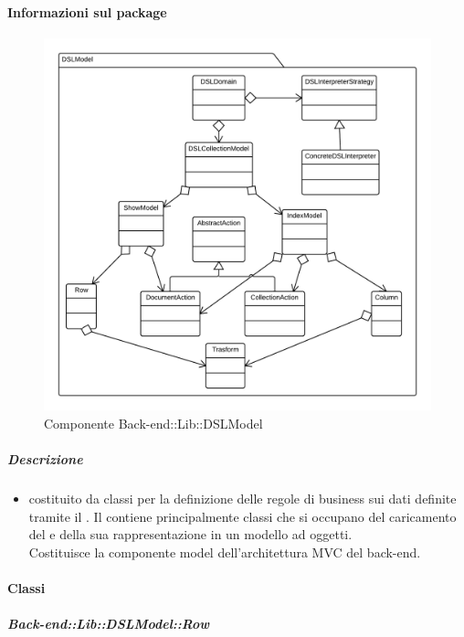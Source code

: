   \paragraph{Informazioni sul package} 
    \begin{figure}[H] 
      \begin{center} 
        \includegraphics[width=\textwidth]{packages/Back-end::Lib::DSLModel.png}  
        \caption{Componente Back-end::Lib::DSLModel}
      \end{center}  
    \end{figure} 
  \subparagraph{Descrizione} 
    \begin{itemize}
    \item[]  costituito da classi per la definizione delle regole di business sui dati definite tramite il . 
Il  contiene principalmente classi che si occupano del caricamento del  e della sua rappresentazione in un modello ad oggetti. \\
Costituisce la componente model dell'architettura MVC del back-end.
    \end{itemize} 
    \paragraph{Classi}
      \subparagraph{Back-end::Lib::DSLModel::Row}
        

